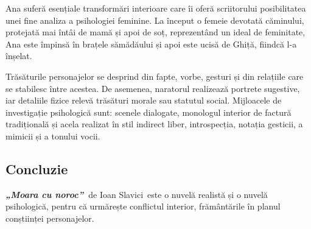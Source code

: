 \documentclass[
12pt,
a4paper
]{article}
\newcommand{\operatitle}{\textbf{\textit{„Moara cu noroc”\ }}} %
\newcommand{\operaauthor}{Ioan Slavici\ }                               %
\begin{document}
Ana suferă esențiale transformări interioare care îi oferă scriitorului posibilitatea unei fine analiza a psihologiei feminine. La început o femeie devotată căminului, protejată mai întâi de mamă și apoi de soț, reprezentând un ideal de feminitate, Ana este împinsă în brațele sămădăului și apoi este ucisă de Ghiță, fiindcă l-a înșelat.

Trăsăturile personajelor se desprind din fapte, vorbe, gesturi și din relațiile care se stabilesc între acestea. De asemenea, naratorul realizează portrete sugestive, iar detaliile fizice relevă trăsături morale sau statutul social. Mijloacele de investigație psihologică sunt: scenele dialogate, monologul interior de factură tradițională și acela realizat în stil indirect liber, introspecția, notația gesticii, a mimicii și a tonului vocii.

\subsection{Concluzie}

\operatitle de \operaauthor este o nuvelă realistă și o nuvelă psihologică, pentru că urmărește conflictul interior, frământările în planul conștiinței personajelor.
\end{document}
